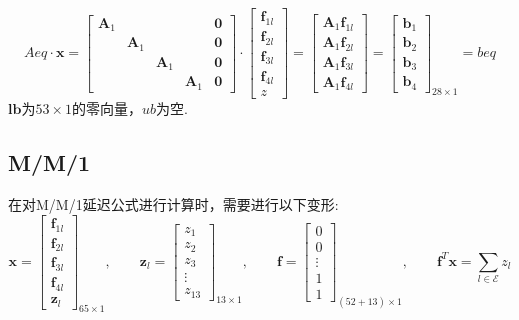 \documentclass[UTF8]{ctexart}
\begin{document}
\[
Aeq\cdot \bm{x}=\begin{bmatrix}
\bm{A}_1&{}&{}&{}&\bm{0}\\
{}&\bm{A}_1&{}&{}&\bm{0}\\
{}&{}&\bm{A}_1&{}&\bm{0}\\
{}&{}&{}&\bm{A}_1&\bm{0}
\end{bmatrix}\cdot
\begin{bmatrix}
\bm{f}_{1l}\\\bm{f}_{2l}\\\bm{f}_{3l}\\\bm{f}_{4l}\\z
\end{bmatrix}=
\begin{bmatrix}
\bm{A}_1\bm{f}_{1l}\\
\bm{A}_1\bm{f}_{2l}\\
\bm{A}_1\bm{f}_{3l}\\
\bm{A}_1\bm{f}_{4l}
\end{bmatrix}=
\begin{bmatrix}
\bm{b}_1\\\bm{b}_2\\\bm{b}_3\\\bm{b}_4
\end{bmatrix}_{28\times 1}=beq\]
$\bm{lb}$为$53\times 1$的零向量，$ub$为空.

\newpage
\subsection{M/M/1}
在对M/M/1延迟公式进行计算时，需要进行以下变形:
\[\bm{x}=\begin{bmatrix}
\bm{f}_{1l}\\\bm{f}_{2l}\\\bm{f}_{3l}\\\bm{f}_{4l}\\\bm{z}_{l}
\end{bmatrix}_{65\times 1},\qquad
\bm{z}_{l}=\begin{bmatrix}
z_{1}\\z_{2}\\z_{3}\\ \vdots\\ z_{13}
\end{bmatrix}_{13\times 1},\qquad
\bm{f}=\begin{bmatrix}
0\\0\\ \vdots\\1\\ 1
\end{bmatrix}_{(52+13)\times 1},\qquad
\bm{f}^T\bm{x}=\sum_{l \in \mathcal{E}}z_l\]
\end{document}
